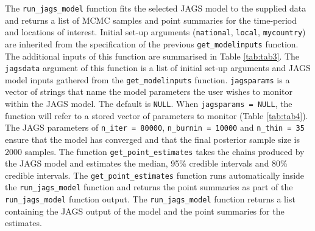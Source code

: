 The \texttt{run\_jags\_model} function fits the selected JAGS model to the supplied data and returns a list of MCMC samples and point summaries for the time-period and locations of interest. Initial set-up arguments (\texttt{national}, \texttt{local}, \texttt{mycountry}) are inherited from the specification of the previous \texttt{get\_modelinputs} function. The additional inputs of this function are summarised in Table \ref{tab:tab3}. The \texttt{jagsdata} argument of this function is a list of initial set-up arguments and JAGS model inputs gathered from the \texttt{get\_modelinputs} function. \texttt{jagsparams} is a vector of strings that name the model parameters the user wishes to monitor within the JAGS model. The default is \texttt{NULL}. When \texttt{jagsparams\ =\ NULL}, the function will refer to a stored vector of parameters to monitor (Table \ref{tab:tab4}). The JAGS parameters of \texttt{n\_iter\ =\ 80000}, \texttt{n\_burnin\ =\ 10000} and \texttt{n\_thin\ =\ 35} ensure that the model has converged and that the final posterior sample size is 2000 samples. The function \texttt{get\_point\_estimates} takes the chains produced by the JAGS model and estimates the median, 95\% credible intervals and 80\% credible intervals. The \texttt{get\_point\_estimates} function runs automatically inside the \texttt{run\_jags\_model} function and returns the point summaries as part of the \texttt{run\_jags\_model} function output. The \texttt{run\_jags\_model} function returns a list containing the JAGS output of the model and the point summaries for the estimates.

